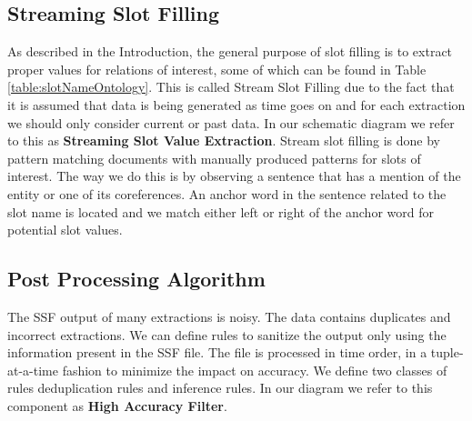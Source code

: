 \subsection{Streaming Slot Filling}
As described in the Introduction, the general purpose of slot filling is to extract proper values for relations of interest, some of which can be found in Table \ref{table:slotNameOntology}. This is called Stream Slot Filling due to the fact that it is assumed that data is being generated as time goes on and for each extraction we should only consider current or past data. In our schematic diagram we refer to this as \textbf{Streaming Slot Value Extraction}. Stream slot filling is done by pattern matching documents with manually 
produced patterns for slots of interest. The way we do this is by observing a 
sentence that has a mention of the entity or one of its coreferences. An 
anchor word in the sentence related to the slot name is located and we match 
either left or right of the anchor word for potential slot values. 

\subsection{Post Processing Algorithm}

The SSF output of many extractions is noisy. The data contains duplicates and 
incorrect extractions. We can define rules to sanitize the output only using 
the information present in the SSF file. The file is processed in time order, 
in a tuple-at-a-time fashion to minimize the impact on accuracy. We define 
two classes of rules deduplication rules and inference rules. In our diagram we refer to this component as \textbf{High Accuracy Filter}.

